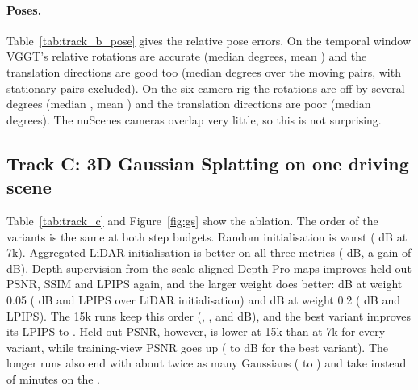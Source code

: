 \documentclass[10pt]{article}
\newcommand{\gpu}{\GPUname}
\begin{document}
\paragraph{Poses.}
Table~\ref{tab:track_b_pose} gives the relative pose errors. On the temporal window VGGT's relative
rotations are accurate (median \BTemprotMedian{} degrees, mean \BTemprotMean) and the translation
directions are good too (median \BTemptransMedian{} degrees over the \BTempnPairsBaseline{} moving pairs,
with \BTempnPairsExcluded{} stationary pairs excluded). On the six-camera rig the rotations are off by
several degrees (median \BRigrotMedian, mean \BRigrotMean) and the translation directions are poor (median
\BRigtransMedian{} degrees). The nuScenes cameras overlap very little, so this is not surprising.

\subsection{Track C: 3D Gaussian Splatting on one driving scene}
\label{sec:track_c}

\begin{table}[t]
\centering
\begin{subtable}[t]{\textwidth}
\centering
{}
\caption{Held-out metrics, number of Gaussians (initial and final), training minutes and render time per view on the \gpu{}. PSNR is mean $\pm$ standard deviation over views for seed 0; ``PSNR train'' is on a subset of training views. \GSseedCaption}
\label{tab:track_c}
\end{subtable}
\caption{Track C ablation on \GSscene{}, \GStestViews{} held-out views at \GSimageW$\times$\GSimageH, \gpu{}.}
\label{tab:track_c_all}
\end{table}

Table~\ref{tab:track_c} and Figure~\ref{fig:gs} show the ablation. The order of the variants is the same
at both step budgets. Random initialisation is worst (\GSRandpsnr{} dB at 7k). Aggregated LiDAR
initialisation is better on all three metrics (\GSLidarpsnr{} dB, a gain of \GSdeltaLidarRandom{} dB).
Depth supervision from the scale-aligned Depth Pro maps improves held-out PSNR, SSIM and LPIPS again, and
the larger weight does better: \GSDepthLopsnr{} dB at weight 0.05 (\GSdeltaDepthLoPsnr{} dB and
\GSdeltaDepthLoLpips{} LPIPS over LiDAR initialisation) and \GSDepthHipsnr{} dB at weight 0.2
(\GSdeltaDepthHiPsnr{} dB and \GSdeltaDepthHiLpips{} LPIPS). The 15k runs keep this order
(\GSRandFifteenKpsnr, \GSLidarFifteenKpsnr, \GSDepthLoFifteenKpsnr{} and \GSDepthHiFifteenKpsnr{} dB), and
the best variant improves its LPIPS to \GSDepthHiFifteenKlpips. Held-out PSNR, however, is lower at 15k
than at 7k for every variant, while training-view PSNR goes up (\GSDepthHipsnrTrain{} to
\GSDepthHiFifteenKpsnrTrain{} dB for the best variant). The longer runs also end with about twice as many
Gaussians (\GSDepthHigaussians{} to \GSDepthHiFifteenKgaussians) and take \GSDepthHiFifteenKtrainMin{}
instead of \GSDepthHitrainMin{} minutes on the \gpu{}.
\end{document}
